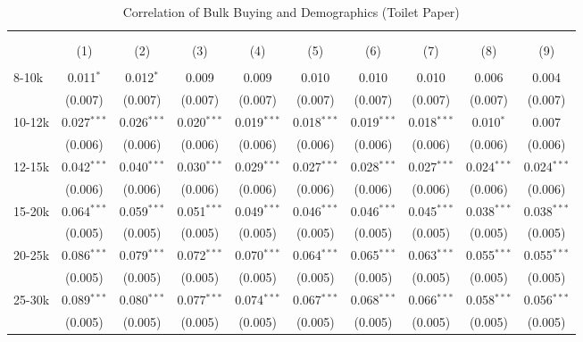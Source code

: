 
\begin{table}[!htbp] \centering 
  \caption{Correlation of Bulk Buying and Demographics (Toilet Paper)} 
  \label{tab:discountingBehavior7734} 
\begin{tabular}{@{\extracolsep{5pt}}lccccccccc} 
\\[-1.8ex]\hline 
\hline \\[-1.8ex] 
\\[-1.8ex] & (1) & (2) & (3) & (4) & (5) & (6) & (7) & (8) & (9)\\ 
\hline \\[-1.8ex] 
 8-10k & 0.011$^{*}$ & 0.012$^{*}$ & 0.009 & 0.009 & 0.010 & 0.010 & 0.010 & 0.006 & 0.004 \\ 
  & (0.007) & (0.007) & (0.007) & (0.007) & (0.007) & (0.007) & (0.007) & (0.007) & (0.007) \\ 
  10-12k & 0.027$^{***}$ & 0.026$^{***}$ & 0.020$^{***}$ & 0.019$^{***}$ & 0.018$^{***}$ & 0.019$^{***}$ & 0.018$^{***}$ & 0.010$^{*}$ & 0.007 \\ 
  & (0.006) & (0.006) & (0.006) & (0.006) & (0.006) & (0.006) & (0.006) & (0.006) & (0.006) \\ 
  12-15k & 0.042$^{***}$ & 0.040$^{***}$ & 0.030$^{***}$ & 0.029$^{***}$ & 0.027$^{***}$ & 0.028$^{***}$ & 0.027$^{***}$ & 0.024$^{***}$ & 0.024$^{***}$ \\ 
  & (0.006) & (0.006) & (0.006) & (0.006) & (0.006) & (0.006) & (0.006) & (0.006) & (0.006) \\ 
  15-20k & 0.064$^{***}$ & 0.059$^{***}$ & 0.051$^{***}$ & 0.049$^{***}$ & 0.046$^{***}$ & 0.046$^{***}$ & 0.045$^{***}$ & 0.038$^{***}$ & 0.038$^{***}$ \\ 
  & (0.005) & (0.005) & (0.005) & (0.005) & (0.005) & (0.005) & (0.005) & (0.005) & (0.005) \\ 
  20-25k & 0.086$^{***}$ & 0.079$^{***}$ & 0.072$^{***}$ & 0.070$^{***}$ & 0.064$^{***}$ & 0.065$^{***}$ & 0.063$^{***}$ & 0.055$^{***}$ & 0.055$^{***}$ \\ 
  & (0.005) & (0.005) & (0.005) & (0.005) & (0.005) & (0.005) & (0.005) & (0.005) & (0.005) \\ 
  25-30k & 0.089$^{***}$ & 0.080$^{***}$ & 0.077$^{***}$ & 0.074$^{***}$ & 0.067$^{***}$ & 0.068$^{***}$ & 0.066$^{***}$ & 0.058$^{***}$ & 0.056$^{***}$ \\ 
  & (0.005) & (0.005) & (0.005) & (0.005) & (0.005) & (0.005) & (0.005) & (0.005) & (0.005) \\ 

\end{tabular}
\end{table}
